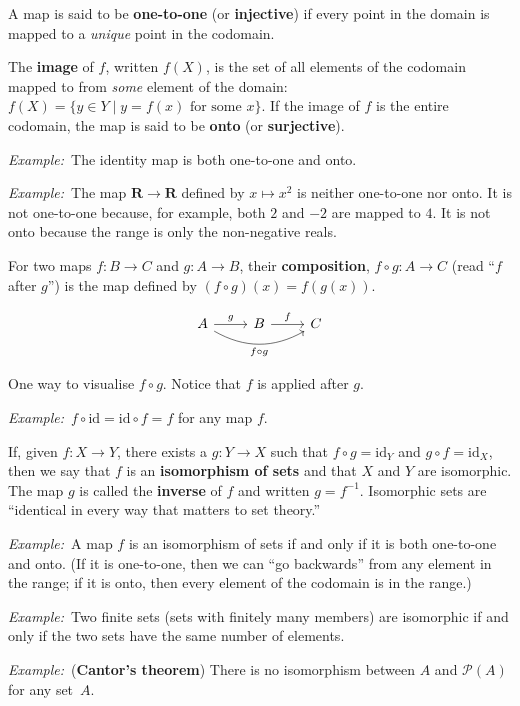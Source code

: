 \documentclass[12pt, a4paper]{article}
\newcommand{\defn}[1]{\textbf{#1}}
\newcommand{\set}[1]{\mathbold{#1}}
\newcommand{\eg}{\emph{Example:}\relax}
\newcommand{\id}{\text{id}}
\begin{document}
A map is said to be \defn{one-to-one} (or \defn{injective}) if every
point in the domain is mapped to a \emph{unique} point in the
codomain.

The \defn{image} of $f$, written $f(X)$, is the set of all elements of
the codomain mapped to from \emph{some} element of the domain: $f(X) =
\{y \in Y \mid \text{$y = f(x)$ for some $x$}\}$. If the image of $f$ is
the entire codomain, the map is said to be \defn{onto} (or
\defn{surjective}).

\eg\ The identity map is both one-to-one and onto.

\eg\ The map $\set{R}\to\set{R}$ defined by $x\mapsto x^2$ is neither
one-to-one nor onto. It is not one-to-one because, for example, both
$2$ and $-2$ are mapped to $4$. It is not onto because the range is
only the non-negative reals.  

For two maps $f\colon B \to C$ and $g\colon A \to B$, their
\defn{composition}, $f\circ g\colon A \to C$ (read “$f$ after $g$”) is the
map defined by $(f\circ g)(x) = f(g(x))$.

\begin{sidefigure}
  \[
  \begin{tikzcd}
    A \arrow [rr, bend right, "f \circ g"' ] \arrow[r, "g"] & B \arrow[r, "f"] & C 
  \end{tikzcd}
  \]
  \caption{One way to visualise $f \circ g$. Notice that $f$ is applied
    after $g$.}
\end{sidefigure}

\eg\ $f\circ\id = \id\circ f = f$ for any map $f$. 

If, given $f\colon X \to Y$, there exists a $g\colon Y \to X$ such that
$f\circ g = \id_Y$ and $g\circ f = \id_X$, then we say that $f$ is an
\defn{isomorphism of sets} and that $X$ and $Y$ are isomorphic. The
map $g$ is called the \defn{inverse} of $f$ and written $g =
f^{-1}$. Isomorphic sets are “identical in every way that matters to
set theory.”

\eg\ A map $f$ is an isomorphism of sets if and only if it is both
one-to-one and onto. (If it is one-to-one, then we can “go backwards”
from any element in the range; if it is onto, then every element of
the codomain is in the range.)

\eg\ Two finite sets (sets with finitely many members) are isomorphic
if and only if the two sets have the same number of elements.

\eg\ (\defn{Cantor's theorem}) There is no isomorphism between $A$ and
$\mathcal{P}(A)$ for any set~$A$.
\end{document}
